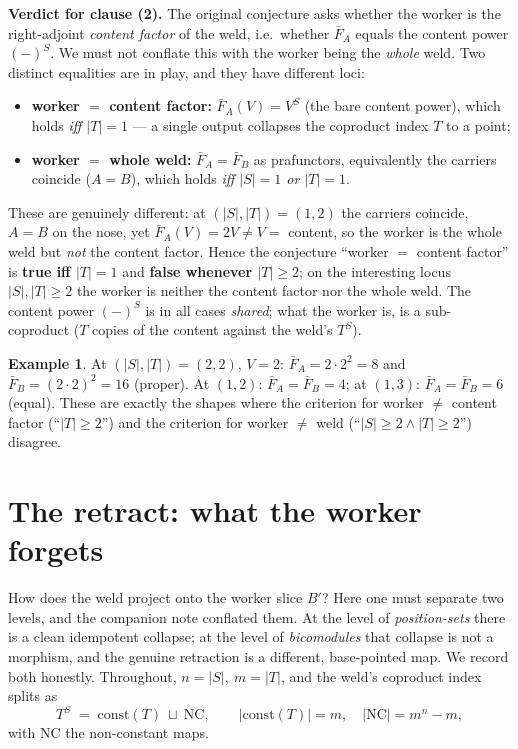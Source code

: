 \documentclass[11pt]{article}
\newcommand{\const}{\mathrm{const}}
\newcommand{\NC}{\mathrm{NC}}
\theoremstyle{plain}
\theoremstyle{definition}
\newtheorem{example}{Example}
\theoremstyle{remark}
\begin{document}
\noindent\textbf{Verdict for clause (2).} The original conjecture asks whether the worker is
the right-adjoint \emph{content factor} of the weld, i.e.\ whether $\bar F_A$ equals the
content power $(-)^S$. We must not conflate this with the worker being the \emph{whole} weld.
Two distinct equalities are in play, and they have different loci:
\begin{itemize}[leftmargin=1.5em]
\item \textbf{worker $=$ content factor:} $\bar F_A(V)=V^S$ (the bare content power), which
  holds \emph{iff $|T|=1$} --- a single output collapses the coproduct index $T$ to a point;
\item \textbf{worker $=$ whole weld:} $\bar F_A=\bar F_B$ as prafunctors, equivalently the
  carriers coincide ($A=B$), which holds \emph{iff $|S|=1$ or $|T|=1$}.
\end{itemize}
These are genuinely different: at $(|S|,|T|)=(1,2)$ the carriers coincide, $A=B$ on the nose,
yet $\bar F_A(V)=2V\ne V=$ content, so the worker is the whole weld but \emph{not} the
content factor. Hence the conjecture ``worker $=$ content factor'' is \textbf{true iff
$|T|=1$} and \textbf{false whenever $|T|\ge2$}; on the interesting locus $|S|,|T|\ge2$ the
worker is neither the content factor nor the whole weld. The content power $(-)^S$ is in all
cases \emph{shared}; what the worker is, is a sub-coproduct ($T$ copies of the content against
the weld's $T^S$).

\begin{example}
At $(|S|,|T|)=(2,2)$, $V=2$: $\bar F_A=2\cdot2^2=8$ and $\bar F_B=(2\cdot2)^2=16$ (proper).
At $(1,2)$: $\bar F_A=\bar F_B=4$; at $(1,3)$: $\bar F_A=\bar F_B=6$ (equal). These are
exactly the shapes where the criterion for worker $\ne$ content factor (``$|T|\ge2$'') and
the criterion for worker $\ne$ weld (``$|S|\ge2\wedge|T|\ge2$'') disagree.
\end{example}

\section{The retract: what the worker forgets}\label{sec:retract}

How does the weld project onto the worker slice $B'$? Here one must separate two levels, and
the companion note conflated them. At the level of \emph{position-sets} there is a clean
idempotent collapse; at the level of \emph{bicomodules} that collapse is not a morphism, and
the genuine retraction is a different, base-pointed map. We record both honestly. Throughout,
$n=|S|,\ m=|T|$, and the weld's coproduct index splits as
\[
  T^S \;=\; \const(T)\ \sqcup\ \NC,
  \qquad |\const(T)|=m,\quad |\NC|=m^{n}-m,
\]
with $\NC$ the non-constant maps.
\end{document}
